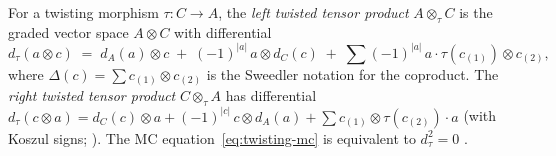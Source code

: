 \begin{definition}
\label{def:twisted-tensor-product}
For a twisting morphism $\tau\colon C \to A$, the
\emph{left twisted tensor product} $A \otimes_\tau C$ is the
graded vector space $A \otimes C$ with differential
\begin{equation}\label{eq:twisted-differential}
d_\tau(a \otimes c)
\;=\;
d_A(a) \otimes c
\;+\; (-1)^{|a|}\, a \otimes d_C(c)
\;+\; \sum (-1)^{|a|}\, a \cdot \tau(c_{(1)}) \otimes c_{(2)},
\end{equation}
where $\Delta(c) = \sum c_{(1)} \otimes c_{(2)}$ is the Sweedler
notation for the coproduct.  The \emph{right twisted tensor product}
$C \otimes_\tau A$ has differential
$d_\tau(c \otimes a) = d_C(c) \otimes a + (-1)^{|c|}\,
c \otimes d_A(a) + \sum c_{(1)} \otimes \tau(c_{(2)}) \cdot a$
(with Koszul signs; \cite[2.1.5]{LV12}).  The MC
equation~\eqref{eq:twisting-mc} is equivalent to
$d_\tau^2 = 0$ \cite[Lemma~2.1.4]{LV12}.
\end{definition}


